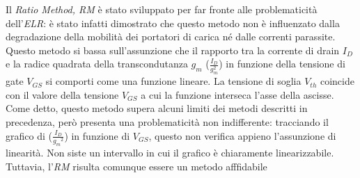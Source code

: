 \documentclass[12pt, letterpaper]{book}
\begin{document}
Il \emph{Ratio Method, RM} è stato sviluppato per far fronte alle problematicità dell'\emph{ELR}: è stato infatti dimostrato che questo metodo non è influenzato dalla degradazione della mobilità dei portatori di carica né dalle correnti parassite. Questo metodo si bassa sull'assunzione che il rapporto tra la corrente di drain $I_D$ e la radice quadrata della transcondutanza $g_m$ ($\frac{I_D}{g_m^2}$) in funzione della tensione di gate $V_{GS}$ si comporti come una funzione lineare. La tensione di soglia $V_{th}$ coincide con il valore della tensione $V_{GS}$ a cui la funzione interseca l'asse della ascisse. \\
Come detto, questo metodo supera alcuni limiti dei metodi descritti in precedenza, però presenta una problematicità non indifferente: tracciando il grafico di ($\frac{I_D}{{g_m}^2}$) in funzione di $V_{GS}$, questo non verifica appieno l'assunzione di linearità. Non siste un intervallo in cui il grafico è chiaramente linearizzabile.\\
Tuttavia, l'\emph{RM} risulta comunque essere un metodo afffidabile 
\end{document}
